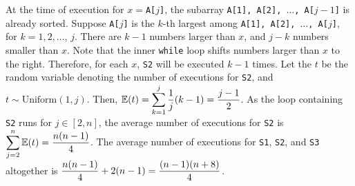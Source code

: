 \documentclass[answers]{exam}
\begin{document}
\begin{questions}
\begin{parts}
\begin{subparts}
            \subpart \phantom{.}
            \begin{solution}
                At the time of execution for \texttt{$x=$A[$j$]}, the subarray \texttt{A[1], A[2], $\ldots$, A[$j-1$]} is already sorted.
                Suppose \texttt{A[$j$]} is the $k$-th largest among \texttt{A[1], A[2], $\ldots$, A[$j$]}, for $k=1, 2, \ldots$, $j$.
                There are $k-1$ numbers larger than $x$, and $j-k$ numbers smaller than $x$.
                Note that the inner \texttt{while} loop shifts numbers larger than $x$ to the right.
                Therefore, for each $x$, \texttt{S2} will be executed $k-1$ times.
                Let the $t$ be the random variable denoting the number of executions for \texttt{S2}, and $t\sim\text{Uniform}(1, j)$.
                Then, $\displaystyle\mathbb{E}(t)=\sum_{k=1}^j \frac{1}{j}(k-1)=\frac{j-1}{2}$.
                As the loop containing \texttt{S2} runs for $j\in[2,n]$, the average number of executions for \texttt{S2} is $\displaystyle \sum_{j=2}^n\mathbb{E}(t)=\frac{n(n-1)}{4}$.
                The average number of executions for \texttt{S1}, \texttt{S2}, and \texttt{S3} altogether is $\displaystyle \frac{n(n-1)}{4} + 2(n-1) = \frac{(n-1)(n+8)}{4}$.
            \end{solution}

        \end{subparts}

    \end{parts}

    \question[60] \phantom{.}
\end{questions}
\end{document}
